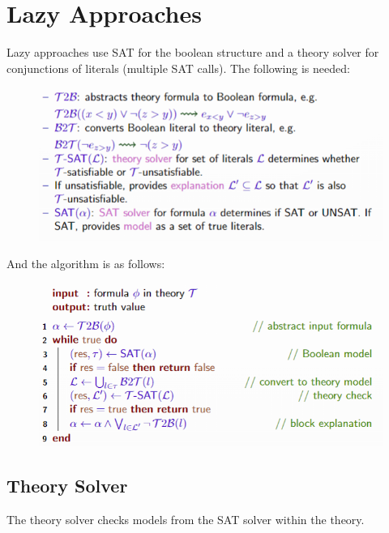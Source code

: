 \documentclass[10pt,a4paper]{report}
\begin{document}
\section{Lazy Approaches}
Lazy approaches use SAT for the boolean structure and a theory solver for conjunctions of literals (multiple SAT calls). The following is needed:
\begin{figure}[H]
    \centering
    \includegraphics[scale=0.5]{30.png}
\end{figure}
And the algorithm is as follows:
\begin{figure}[H]
    \centering
    \includegraphics[scale=0.5]{31.png}
\end{figure}
\subsection{Theory Solver}
The theory solver checks models from the SAT solver within the theory.
\end{document}
